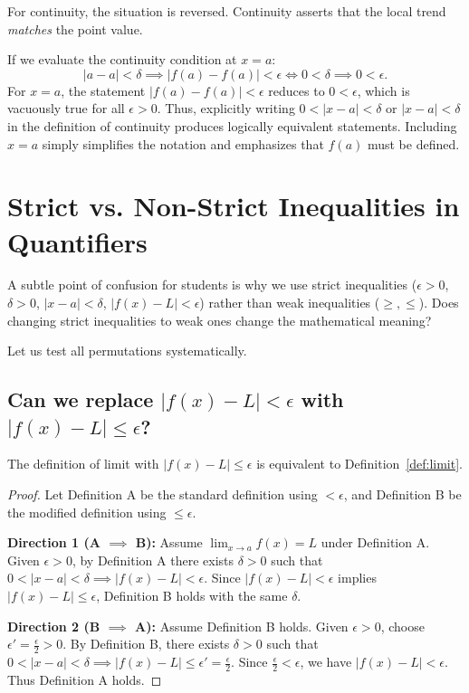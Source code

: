 \documentclass{essay}
\begin{document}
For continuity, the situation is reversed. Continuity asserts that the local trend \emph{matches} the point value.

If we evaluate the continuity condition at \(x = a\):
\[ |a - a| < \delta \implies |f(a) - f(a)| < \epsilon \iff 0 < \delta \implies 0 < \epsilon. \]
For \(x = a\), the statement \(|f(a) - f(a)| < \epsilon\) reduces to \(0 < \epsilon\), which is vacuously true for all \(\epsilon > 0\). Thus, explicitly writing \(0 < |x - a| < \delta\) or \(|x - a| < \delta\) in the definition of continuity produces logically equivalent statements. Including \(x = a\) simply simplifies the notation and emphasizes that \(f(a)\) must be defined.

\section{Strict vs. Non-Strict Inequalities in Quantifiers}

A subtle point of confusion for students is why we use strict inequalities (\(\epsilon > 0\), \(\delta > 0\), \(|x - a| < \delta\), \(|f(x) - L| < \epsilon\)) rather than weak inequalities (\(\ge, \le\)). Does changing strict inequalities to weak ones change the mathematical meaning?

Let us test all permutations systematically.

\subsection{Can we replace \(|f(x) - L| < \epsilon\) with \(|f(x) - L| \le \epsilon\)?}

\begin{theorem}
  The definition of limit with \(|f(x) - L| \le \epsilon\) is equivalent to Definition~\ref{def:limit}.
\end{theorem}

\begin{proof}
  Let Definition A be the standard definition using \(< \epsilon\), and Definition B be the modified definition using \(\le \epsilon\).

  \textbf{Direction 1 (A \(\implies\) B):} Assume \(\lim_{x \to a} f(x) = L\) under Definition A. Given \(\epsilon > 0\), by Definition A there exists \(\delta > 0\) such that \(0 < |x - a| < \delta \implies |f(x) - L| < \epsilon\). Since \(|f(x) - L| < \epsilon\) implies \(|f(x) - L| \le \epsilon\), Definition B holds with the same \(\delta\).

  \textbf{Direction 2 (B \(\implies\) A):} Assume Definition B holds. Given \(\epsilon > 0\), choose \(\epsilon' = \frac{\epsilon}{2} > 0\). By Definition B, there exists \(\delta > 0\) such that \(0 < |x - a| < \delta \implies |f(x) - L| \le \epsilon' = \frac{\epsilon}{2}\). Since \(\frac{\epsilon}{2} < \epsilon\), we have \(|f(x) - L| < \epsilon\). Thus Definition A holds.
\end{proof}
\end{document}
